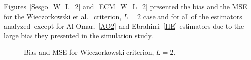 \documentclass[journal]{IEEEtran}
\begin{document}
Figures~\ref{Sesgo_W_L=2} and~\ref{ECM_W_L=2} presented the bias and the MSE for the Wieczorkowski et al.~\cite{Wieczorkowski1999} criterion, $L=2$ case and for all of the estimators analyzed, except for Al-Omari~\eqref{AO2} and Ebrahimi~\eqref{HE} estimators due to the large bias they presented in the simulation study.  
\begin{figure}[hbt]
	\centering
	\caption{Bias and MSE for Wieczorkowski criterion, $L=2$.}
\end{figure}    
\end{document}
